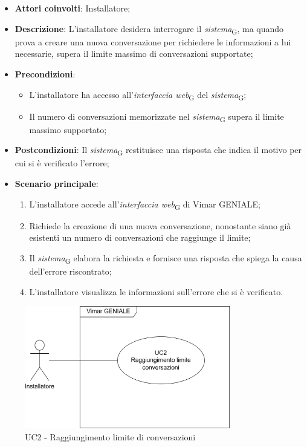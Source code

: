 \begin{itemize}
    \item \textbf{Attori coinvolti}: Installatore;
    \item \textbf{Descrizione}: L’installatore desidera interrogare il \textit{sistema}\textsubscript{G}, ma quando prova a creare una nuova conversazione per richiedere le informazioni a lui necessarie, supera il limite massimo di conversazioni supportate;
    \item \textbf{Precondizioni}: 
        \begin{itemize}
            \item L’installatore ha accesso all’\textit{interfaccia web}\textsubscript{G} del \textit{sistema}\textsubscript{G};
            \item Il numero di conversazioni memorizzate nel \textit{sistema}\textsubscript{G} supera il limite massimo supportato;
        \end{itemize}
    \item \textbf{Postcondizioni}:  Il \textit{sistema}\textsubscript{G} restituisce una risposta che indica il motivo per cui si è verificato l’errore;
    \item \textbf{Scenario principale}:
    \begin{enumerate}
    \item L’installatore accede all’\textit{interfaccia web}\textsubscript{G} di Vimar GENIALE;
    \item Richiede la creazione di una nuova conversazione, nonostante siano già esistenti un numero di conversazioni che raggiunge il limite;
    \item Il \textit{sistema}\textsubscript{G} elabora la richiesta e fornisce una risposta che spiega la causa dell'errore riscontrato;
    \item L’installatore visualizza le informazioni sull’errore che si è verificato.
    \end{enumerate}
\end{itemize}
\begin{figure}[H]
\centering
\includegraphics[width=0.8\textwidth]{contents/casi_duso/png/UC2.png}
\caption{UC2 - Raggiungimento limite di conversazioni}
\end{figure}


